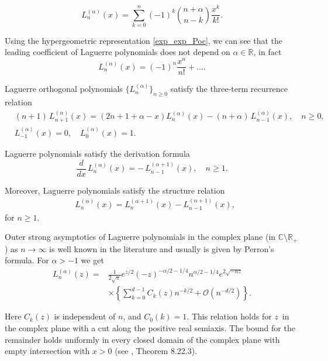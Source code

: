 \documentclass[reqno,10pt]{amsart}
\theoremstyle{plain}
\numberwithin{equation}{section}
\numberwithin{figure}{section}
\begin{document}
\begin{equation}\label{exp_exp_Poc}
L_n^{(\alpha)}(x) = \sum_{k=0}^n (-1)^k  \binom{n+\alpha}{n-k} \frac{x^{k}}{k!}.
\end{equation}

Using the hypergeometric representation \eqref{exp_exp_Poc}, we can see that the leading coefficient of Laguerre polynomials does not depend on $\alpha \in \mathbb{R}$, in fact
$$
L_n^{(\alpha)}(x) = (-1)^n \frac{x^n}{n!} + \ldots.
$$


Laguerre orthogonal polynomials $\{L_n^{(\alpha)}\}_{n\geqslant 0}$ satisfy the three-term recurrence relation
\begin{equation}\label{ttrr}
\begin{aligned}
& (n+1)\,L_{n+1}^{(\alpha)}(x) = (2n+1 + \alpha -x)L_{n}^{(\alpha)}(x) - (n+\alpha) \,L_{n-1}^{(\alpha)}(x), \quad n\geqslant 0,\\
& L_{-1}^{(\alpha)}(x) = 0, \quad L_0^{(\alpha)}(x) = 1.
\end{aligned}
\end{equation}

Laguerre polynomials satisfy the derivation formula
\begin{equation}\label{der_formula}
\frac{d}{dx}\,L^{(\alpha)}_n(x) = - \,L^{(\alpha+1)}_{n-1}(x), \quad n\geqslant 1.
\end{equation}

Moreover, Laguerre polynomials satisfy the structure relation
\begin{align}
&L^{(\alpha)}_{n} (x) = L^{(\alpha+1)}_{n} (x) - L^{(\alpha+1)}_{n-1} (x), \label{str_rel2}
\end{align}
for $n\geqslant 1$.


Outer strong asymptotics of Laguerre polynomials in the complex plane 
(in $\mathbb{C}\setminus\mathbb{R}_{+}$) as $n\to\infty$ is well known in the literature 
and usually is given by Perron's formula. For $\alpha>-1$ we get
\begin{align}
L_{n}^{(\alpha )}\left( z\right) =&\frac{1}{2\sqrt{\pi}}e^{z/2}\left(
-z\right) ^{-\alpha /2-1/4}n^{\alpha /2-1/4}e^{2\sqrt{ -nz}}\nonumber\\
& \times \left\{ \sum\limits_{k=0}^{d-1}C_{k}(z)n^{-k/2}+\mathcal{O}%
(n^{-d/2})\right\} \label{Perron}.
\end{align}

Here $C_{k}(z)$ is independent of $n$, and $C_0(k)=1$. This relation holds for $z$\ in the
complex plane with a cut along the positive real semiaxis. The bound for the
remainder holds uniformly in every closed domain of the complex plane with
empty intersection with $x>0$ (see \cite{Szego75}, Theorem 8.22.3).
\end{document}

